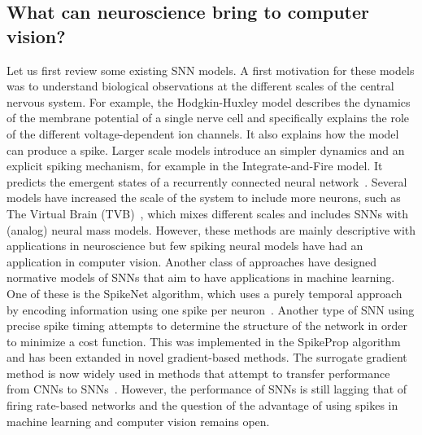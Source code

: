 \documentclass[default]{sn-jnl}%
\theoremstyle{thmstyleone}%
\theoremstyle{thmstyletwo}%
\theoremstyle{thmstylethree}%
\begin{document}
\subsection{What can neuroscience bring to computer vision?}%
Let us first review some existing SNN models. A first motivation for these models was to understand biological observations at the different scales of the central nervous system. For example, the Hodgkin-Huxley model describes the dynamics of the membrane potential of a single nerve cell and specifically explains the role of the different voltage-dependent ion channels. It also explains how the model can produce a spike. Larger scale models introduce an simpler dynamics and an explicit spiking mechanism, for example in the Integrate-and-Fire model. It predicts the emergent states of a recurrently connected neural network~\citep{brunel_phase_2000}. Several models have increased the scale of the system to include more neurons, such as The Virtual Brain (TVB)~\citep{sanz_leon_virtual_2013}, which mixes different scales and includes SNNs with (analog) neural mass models. However, these methods are mainly descriptive with applications in neuroscience but few spiking neural models have had an application in computer vision. Another class of approaches have designed normative models of SNNs that aim to have applications in machine learning. One of these is the SpikeNet algorithm, which uses a purely temporal approach by encoding information using one spike per neuron~\citep{delorme_spikenet_1999}. Another type of SNN using precise spike timing attempts to determine the structure of the network in order to minimize a cost function. This was implemented in the SpikeProp algorithm~\citep{bohte_error-backpropagation_2002} and has been extanded in novel gradient-based methods. The surrogate gradient method is now widely used in methods that attempt to transfer performance from CNNs to SNNs~\citep{zenke_remarkable_2021}. However, the performance of SNNs is still lagging that of firing rate-based networks and the question of the advantage of using spikes in machine learning and computer vision remains open.
\end{document}
